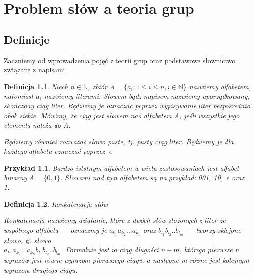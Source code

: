 \documentclass[licencjacka]{pracamgr}
\newtheorem{defi}{Definicja}[section]
\newtheorem{exampl}{Przykład}[section]
\begin{document}
\chapter{Problem słów a teoria grup}\label{r:concepts}

\section{Definicje}

Zaczniemy od wprowadzenia pojęć z teorii grup oraz podstawowe słownictwo związane z napisami.

\begin{defi}\label{strings}
Niech $n \in \mathbb{N}$, zbiór $A = \{ a_i : 1 \leq i \leq n, i \in \mathbb{N} \}$ nazwiemy alfabetem, natomiast $a_i$ nazwiemy literami. Słowem bądź napisem nazwiemy uporządkowany, skończony ciąg liter. Będziemy je oznaczać poprzez wypisywanie liter bezpośrednio obok siebie. Mówimy, że ciąg jest słowem nad alfabetem A, jeśli wszystkie jego elementy należą do A.

Będziemy również rozważać słowo puste, tj. pusty ciąg liter. Będziemy je dla każdego alfabetu oznaczać poprzez $\ \epsilon$.
\end{defi}

\begin{exampl}\label{string_binary}
Bardzo istotnym alfabetem w wielu zastosowaniach jest alfabet binarny $A = \{ 0, 1 \}$. Słowami nad tym alfabetem są na przykład: 001, 10, $\ \epsilon$ oraz 1.
\end{exampl}

\begin{defi}{Konkatenacja słów}\label{concatenation}

Konkatenacją nazwiemy działanie, które z dwóch słów złożonych z liter ze wspólnego alfabetu — oznaczmy je $a_{k_1}a_{k_2}...a_{k_n}$ oraz $b_{l_1}b_{l_2}..b_{l_m}$ — tworzy sklejone słowo, tj. słowo \\ $a_{k_1}a_{k_2}...a_{k_n}b_{l_1}b_{l_2}..b_{l_m}$. Formalnie jest to ciąg długości $n+m$, którego pierwsze n wyrazów jest równe wyrazom pierwszego ciągu, a następne m równe jest kolejnym wyrazom drugiego ciągu.
\end{defi}
\end{document}
